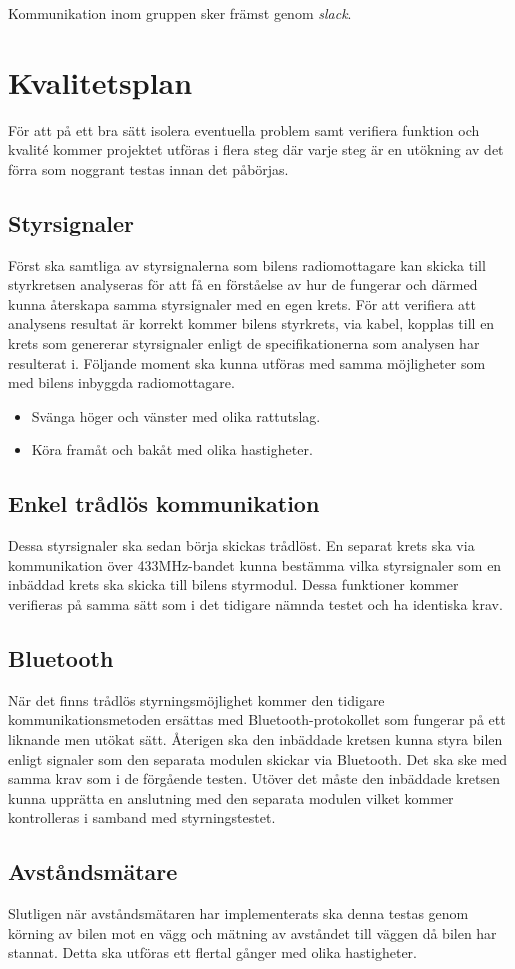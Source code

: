 \documentclass[a4paper]{article}
\begin{document}
\vspace{5mm}
\noindent Kommunikation inom gruppen sker främst genom {\it slack}.


\section{Kvalitetsplan}
För att på ett bra sätt isolera eventuella problem samt verifiera funktion och kvalité kommer projektet utföras i flera steg där varje steg är en utökning av det förra som noggrant testas innan det påbörjas. 

\subsection{Styrsignaler}
Först ska samtliga av styrsignalerna som bilens radiomottagare kan skicka till styrkretsen analyseras för att få en förståelse av hur de fungerar och därmed kunna återskapa samma styrsignaler med en egen krets. För att verifiera att analysens resultat är korrekt kommer bilens styrkrets, via kabel, kopplas till en krets som genererar styrsignaler enligt de specifikationerna som analysen har resulterat i. Följande moment ska kunna utföras med samma möjligheter som med bilens inbyggda radiomottagare.
\begin{itemize}  
    \item Svänga höger och vänster med olika rattutslag.
    \item Köra framåt och bakåt med olika hastigheter.
\end{itemize}

\subsection{Enkel trådlös kommunikation}
Dessa styrsignaler ska sedan börja skickas trådlöst. En separat krets ska via kommunikation över 433MHz-bandet kunna bestämma vilka styrsignaler som en inbäddad krets ska skicka till bilens styrmodul. Dessa funktioner kommer verifieras på samma sätt som i det tidigare nämnda testet och ha identiska krav.  

\subsection{Bluetooth}
När det finns trådlös styrningsmöjlighet kommer den tidigare kommunikationsmetoden ersättas med Bluetooth-protokollet som fungerar på ett liknande men utökat sätt. Återigen ska den inbäddade kretsen kunna styra bilen enligt signaler som den separata modulen skickar via Bluetooth. Det ska ske med samma krav som i de förgående testen. Utöver det måste den inbäddade kretsen kunna upprätta en anslutning med den separata modulen vilket kommer kontrolleras i samband med styrningstestet.

\subsection{Avståndsmätare}
Slutligen när avståndsmätaren har implementerats ska denna testas genom körning av bilen mot en vägg och mätning av avståndet till väggen då bilen har stannat. Detta ska utföras ett flertal gånger med olika hastigheter. 
\end{document}
